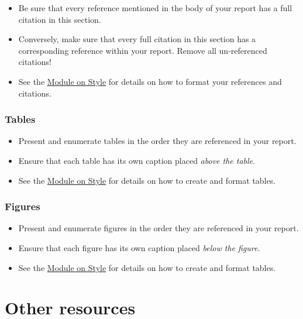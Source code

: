 \documentclass[
]{book}
\begin{document}
\begin{itemize}
\item
  Be sure that every reference mentioned in the body of your report has a full citation in this section.
\item
  Conversely, make sure that every full citation in this section has a corresponding reference within your report. Remove all un-referenced citations!
\item
  See the \protect\hyperlink{style}{Module on Style} for details on how to format your references and citations.
\end{itemize}

\hypertarget{tables-2}{%
\subsubsection*{Tables}\label{tables-2}}

\begin{itemize}
\item
  Present and enumerate tables in the order they are referenced in your report.
\item
  Ensure that each table has its own caption placed \emph{above the table}.
\item
  See the \protect\hyperlink{style}{Module on Style} for details on how to create and format tables.
\end{itemize}

\hypertarget{figures-1}{%
\subsubsection*{Figures}\label{figures-1}}

\begin{itemize}
\item
  Present and enumerate figures in the order they are referenced in your report.
\item
  Ensure that each figure has its own caption placed \emph{below the figure}.
\item
  See the \protect\hyperlink{style}{Module on Style} for details on how to create and format tables.
\end{itemize}

\hypertarget{other-resources-8}{%
\section*{Other resources}\label{other-resources-8}}
\end{document}
